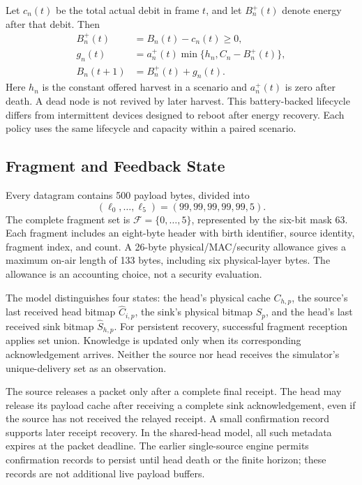 \documentclass[journal,10pt]{IEEEtran}
\begin{document}
Let $c_n(t)$ be the total actual debit in frame $t$, and let $B_n^+(t)$ denote energy after that debit. Then
\begin{align}
B_n^+(t)&=B_n(t)-c_n(t)\geq0,\\
g_n(t)&=a_n^+(t)\min\{h_n,C_n-B_n^+(t)\},\\
B_n(t+1)&=B_n^+(t)+g_n(t).
\label{eq:battery}
\end{align}
Here $h_n$ is the constant offered harvest in a scenario and $a_n^+(t)$ is zero after death. A dead node is not revived by later harvest. This battery-backed lifecycle differs from intermittent devices designed to reboot after energy recovery. Each policy uses the same lifecycle and capacity within a paired scenario.

\subsection{Fragment and Feedback State}
Every datagram contains 500 payload bytes, divided into
\begin{equation}
(\ell_0,\ldots,\ell_5)=(99,99,99,99,99,5).
\end{equation}
The complete fragment set is $\mathcal F=\{0,\ldots,5\}$, represented by the six-bit mask $63$. Each fragment includes an eight-byte header with birth identifier, source identity, fragment index, and count. A 26-byte physical/MAC/security allowance gives a maximum on-air length of 133 bytes, including six physical-layer bytes. The allowance is an accounting choice, not a security evaluation.

The model distinguishes four states: the head's physical cache $C_{h,p}$, the source's last received head bitmap $\widehat C_{i,p}$, the sink's physical bitmap $S_p$, and the head's last received sink bitmap $\widehat S_{h,p}$. For persistent recovery, successful fragment reception applies set union. Knowledge is updated only when its corresponding acknowledgement arrives. Neither the source nor head receives the simulator's unique-delivery set as an observation.

The source releases a packet only after a complete final receipt. The head may release its payload cache after receiving a complete sink acknowledgement, even if the source has not received the relayed receipt. A small confirmation record supports later receipt recovery. In the shared-head model, all such metadata expires at the packet deadline. The earlier single-source engine permits confirmation records to persist until head death or the finite horizon; these records are not additional live payload buffers.
\end{document}

